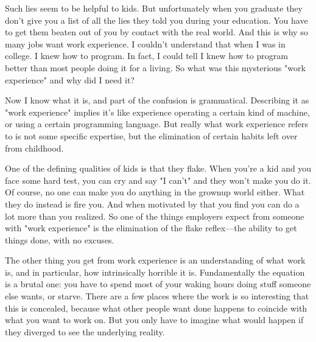 Such lies seem to be helpful to kids.
                  But unfortunately when you graduate they don't give you a list
                  of all the lies they told you during your education. You have
                  to get them beaten out of you by contact with the real world.
                  And this is why so many jobs want work experience. I couldn't
                  understand that when I was in college. I knew how to program.
                  In fact, I could tell I knew how to program better than most
                  people doing it for a living. So what was this mysterious
                  "work experience" and why did I need it?

Now I know
                  what it is, and part of the confusion is grammatical.
                  Describing it as "work experience" implies it's like
                  experience operating a certain kind of machine, or using a
                  certain programming language. But really what work experience
                  refers to is not some specific expertise, but the elimination
                  of certain habits left over from childhood.

One of
                  the defining qualities of kids is that they flake. When you're
                  a kid and you face some hard test, you can cry and say "I
                  can't" and they won't make you do it. Of course, no one can
                  make you do anything in the grownup world either. What they do
                  instead is fire you. And when motivated by that you find you
                  can do a lot more than you realized. So one of the things
                  employers expect from someone with "work experience" is the
                  elimination of the flake reflex---the ability to get
                  things done, with no excuses.

The other thing you
                  get from work experience is an understanding of what work is,
                  and in particular, how intrinsically horrible it is.
                  Fundamentally the equation is a brutal one: you have to spend
                  most of your waking hours doing stuff someone else wants, or
                  starve. There are a few places where the work is so
                  interesting that this is concealed, because what other people
                  want done happens to coincide with what you want to work on.
                  But you only have to imagine what would happen if they
                  diverged to see the underlying reality.

